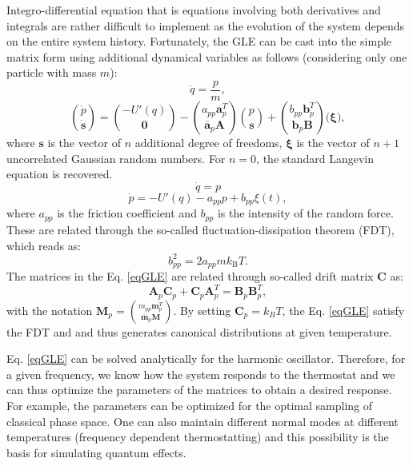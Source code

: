 \documentclass[12pt,a4paper]{article}
\begin{document}
Integro-differential equation that is equations involving both derivatives and integrals are rather difficult to implement as the evolution of the system depends on the entire system history. Fortunately, the GLE can be cast into the simple matrix form using additional 
dynamical variables as follows (considering only one particle with mass $m$)\cite{Ceriotti2010}:
\begin{equation}
\dot{q}=\frac{p}{m} ,
\label{eqGLE}
\end{equation}
$${\dot{p} \choose \mathbf{\dot{s}}} = {-U'(q) \choose \mathbf{0}} - 
{a_{pp}  \textbf{a}_p^T  \choose \mathbf{\overline{a}}_p  \mathbf{A}} {p \choose \mathbf{s}} +
{b_{pp}  \mathbf{b}_p^T  \choose \mathbf{{b}}_p  \mathbf{B}}
\Bigg(\mathbf{\xi}\Bigg)   ,$$
where $\mathbf{s}$ is the vector of $n$ additional degree of freedoms, $\mathbf{\xi}$ is the vector of $n+1$ uncorrelated Gaussian random numbers. For $n=0$, the standard Langevin equation is recovered.
\begin{equation}
\dot{q}=p
\label{eqLE}
\end{equation}
$$\dot{p}=-U'(q)-a_{pp}p+b_{pp}\xi(t)  ,$$
where $a_{pp}$ is the friction coefficient and $b_{pp}$ is the intensity of the random force. These are related through the so-called fluctuation-dissipation theorem (FDT), which reads as:
\begin{equation}
b_{pp}^2=2a_{pp}m k_\mathrm{B} T  .
\end{equation}
\noindent
The matrices in the Eq. \ref{eqGLE} are related through so-called drift matrix $\mathbf{C}$ as\cite{Ceriotti2010}:
\begin{equation}
\mathbf{A}_p \mathbf{C}_p+\mathbf{C}_p\mathbf{A}_p^T=\mathbf{B}_p\mathbf{B}_p^T  ,
\label{eqmatrix}
\end{equation}
with the notation $\mathbf{M}_p={m_{pp}  \textbf{m}_p^T  \choose \mathbf{\overline{m}}_p  \mathbf{M}}$. 
By setting $\mathbf{C}_p=k_{B} T$, the Eq. \ref{eqGLE} satisfy the FDT and and thus generates canonical distributions at given temperature.

Eq. \ref{eqGLE} can be solved analytically for the harmonic oscillator. Therefore, for a given frequency, 
we know how the system responds to the thermostat and we can thus optimize the parameters of the matrices to obtain a desired response. 
For example, the parameters can be optimized for the optimal sampling of classical phase space. One can also maintain different normal modes at different temperatures (frequency dependent thermostatting) and this possibility is the basis for simulating quantum effects.
\end{document}
